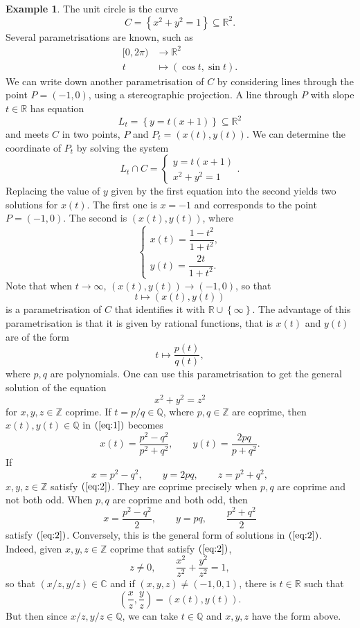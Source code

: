 \documentclass{article}
\newcommand{\Z}{\mathbb{Z}}
\newcommand{\Q}{\mathbb{Q}}
\newcommand{\R}{\mathbb{R}}
\newcommand{\C}{\mathbb{C}}
\newcommand{\rb}[1]{\left( #1 \right)}
\newcommand{\cb}[1]{\left\{ #1 \right\}}
\theoremstyle{definition}\newtheorem{definition}{Definition}[section]
\theoremstyle{definition}\newtheorem{notation}[definition]{Notation}
\theoremstyle{definition}\newtheorem{remark}[definition]{Remark}
\theoremstyle{definition}\newtheorem{example1}[definition]{Example}
\theoremstyle{definition}\newtheorem{fact}{Fact}
\theoremstyle{definition}\newtheorem{exercise}{Exercise}
\theoremstyle{definition}\newtheorem*{example2}{Example}
\begin{document}
\begin{example1}
The unit circle is the curve
$$ C = \cb{x^2 + y^2 = 1} \subseteq \R^2. $$
Several parametrisations are known, such as
\begin{align*}
[0, 2\pi) & \to \R^2 \\
t & \mapsto \rb{\cos t, \sin t}.
\end{align*}
We can write down another parametrisation of $ C $ by considering lines through the point $ P = \rb{-1, 0} $, using a stereographic projection. A line through $ P $ with slope $ t \in \R $ has equation
$$ L_t = \cb{y = t\rb{x + 1}} \subseteq \R^2 $$
and meets $ C $ in two points, $ P $ and $ P_t = \rb{x\rb{t}, y\rb{t}} $. We can determine the coordinate of $ P_t $ by solving the system
$$ L_t \cap C = \begin{cases}
y = t\rb{x + 1} \\
x^2 + y^2 = 1
\end{cases}. $$
Replacing the value of $ y $ given by the first equation into the second yields two solutions for $ x\rb{t} $. The first one is $ x = -1 $ and corresponds to the point $ P = \rb{-1, 0} $. The second is $ \rb{x\rb{t}, y\rb{t}} $, where
\begin{equation}
\label{eq:1}
\begin{cases}
x\rb{t} = \dfrac{1 - t^2}{1 + t^2}, \\
y\rb{t} = \dfrac{2t}{1 + t^2}.
\end{cases}
\end{equation}
Note that when $ t \to \infty $, $ \rb{x\rb{t}, y\rb{t}} \to \rb{-1, 0} $, so that
$$ t \mapsto \rb{x\rb{t}, y\rb{t}} $$
is a parametrisation of $ C $ that identifies it with $ \R \cup \cb{\infty} $. The advantage of this parametrisation is that it is given by rational functions, that is $ x\rb{t} $ and $ y\rb{t} $ are of the form
$$ t \mapsto \dfrac{p\rb{t}}{q\rb{t}}, $$
where $ p, q $ are polynomials. One can use this parametrisation to get the general solution of the equation
\begin{equation}
\label{eq:2}
x^2 + y^2 = z^2
\end{equation}
for $ x, y, z \in \Z $ coprime. If $ t = p / q \in \Q $, where $ p, q \in \Z $ are coprime, then $ x\rb{t}, y\rb{t} \in \Q $ in $ \rb{\ref{eq:1}} $ becomes
$$ x\rb{t} = \dfrac{p^2 - q^2}{p^2 + q^2}, \qquad y\rb{t} = \dfrac{2pq}{p + q^2}. $$
If
$$ x = p^2 - q^2, \qquad y = 2pq, \qquad z = p^2 + q^2, $$
$ x, y, z \in \Z $ satisfy $ \rb{\ref{eq:2}} $. They are coprime precisely when $ p, q $ are coprime and not both odd. When $ p, q $ are coprime and both odd, then
$$ x = \dfrac{p^2 - q^2}{2}, \qquad y = pq, \qquad \dfrac{p^2 + q^2}{2} $$
satisfy $ \rb{\ref{eq:2}} $. Conversely, this is the general form of solutions in $ \rb{\ref{eq:2}} $. Indeed, given $ x, y, z \in \Z $ coprime that satisfy $ \rb{\ref{eq:2}} $,
$$ z \ne 0, \qquad \dfrac{x^2}{z^2} + \dfrac{y^2}{z^2} = 1, $$
so that $ \rb{x / z, y / z} \in \C $ and if $ \rb{x, y, z} \ne \rb{-1, 0, 1} $, there is $ t \in \R $ such that
$$ \rb{\dfrac{x}{z}, \dfrac{y}{z}} = \rb{x\rb{t}, y\rb{t}}. $$
But then since $ x / z, y / z \in \Q $, we can take $ t \in \Q $ and $ x, y, z $ have the form above.
\end{example1}
\end{document}
